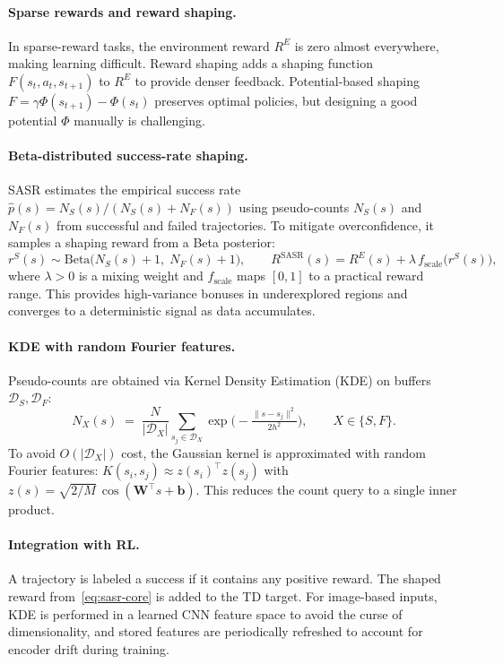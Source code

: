 \documentclass{article}
\begin{document}
\paragraph{Sparse rewards and reward shaping.}
In sparse-reward tasks, the environment reward \(R^E\) is zero almost everywhere, making learning difficult. Reward shaping adds a shaping function \(F(s_t,a_t,s_{t+1})\) to \(R^E\) to provide denser feedback. Potential-based shaping \(F = \gamma\Phi(s_{t+1}) - \Phi(s_t)\) preserves optimal policies, but designing a good potential \(\Phi\) manually is challenging.

\paragraph{Beta-distributed success-rate shaping.}
SASR estimates the empirical success rate \(\hat p(s) = N_S(s)/(N_S(s)+N_F(s))\) using pseudo-counts \(N_S(s)\) and \(N_F(s)\) from successful and failed trajectories. To mitigate overconfidence, it samples a shaping reward from a Beta posterior:
\begin{equation}
r^S(s) \sim \mathrm{Beta}\!\big(N_S(s)+1,\; N_F(s)+1\big), \qquad
R^{\mathrm{SASR}}(s) = R^E(s) + \lambda\, f_{\mathrm{scale}}\!\big(r^S(s)\big),
\label{eq:sasr-core}
\end{equation}
where \(\lambda>0\) is a mixing weight and \(f_{\mathrm{scale}}\) maps \([0,1]\) to a practical reward range. This provides high-variance bonuses in underexplored regions and converges to a deterministic signal as data accumulates.

\paragraph{KDE with random Fourier features.}
Pseudo-counts are obtained via Kernel Density Estimation (KDE) on buffers \(\mathcal{D}_S, \mathcal{D}_F\):
\begin{equation}
N_X(s) \;=\; \frac{N}{|\mathcal{D}_X|}\sum_{s_j\in\mathcal{D}_X} \exp\!\Big(-\tfrac{\|s-s_j\|^2}{2h^2}\Big),\qquad X\in\{S,F\}.
\label{eq:kde}
\end{equation}
To avoid \(O(|\mathcal{D}_X|)\) cost, the Gaussian kernel is approximated with random Fourier features: \(K(s_i,s_j)\approx z(s_i)^\top z(s_j)\) with \(z(s) = \sqrt{2/M}\,\cos(\boldsymbol{W}^\top s + \boldsymbol{b})\). This reduces the count query to a single inner product.

\paragraph{Integration with RL.}
A trajectory is labeled a success if it contains any positive reward. The shaped reward from~\eqref{eq:sasr-core} is added to the TD target. For image-based inputs, KDE is performed in a learned CNN feature space to avoid the curse of dimensionality, and stored features are periodically refreshed to account for encoder drift during training.
\end{document}
